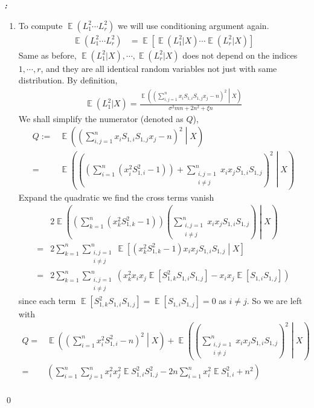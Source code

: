\documentclass[12pt]{extarticle}
\renewenvironment{proof}[1][\proofname]{ { \it\bfseries #1: }}{\qed}
\newcommand{\1}{\field{1}}
\DeclareMathOperator{\E}{\mathbb{E}}
\numberwithin{equation}{section}
\begin{document}
\begin{proof}
\begin{enumerate}[label={(\arabic*)}]
\item 
To compute $\E (L_{1}^{2} \cdots L_{r}^{2}) $ we will use conditioning argument again.
\begin{align*}
    \E (L_{1}^{2} \cdots L_{r}^{2}) 
  & = \E \left[ \E (L_{1}^{2}|X) \cdots \E (L_{r}^{2}|X) \right] 
\end{align*}
Same as before, $\E (L_{1}^{2}|X),\cdots,\E (L_{r}^{2}|X)$ does not depend on the indices $1,\cdots, r$, and they are all identical random variables not just with same distribution. By definition,
\begin{align*}
  \E \left( L_1^2| X\right)
  =  \frac{\E  \left(  (\sum_{i,j=1}^n x_i S_{1,i} S_{1,j}x_j -n)^2 \middle| X\right) }{\sigma^2 mn+2n^2 + \xi n} 
\end{align*}
We shall simplify the numerator (denoted as $Q$),
\begin{align*}
  Q:= & \E   \left( (\sum_{i,j=1}^n x_i S_{1,i} S_{1,j}x_j -n)^2 \middle| X\right) \\
  = & \E \left( \left( \left(\sum_{i=1}^n (x_i^2 S_{1,i}^2 -1) \right) +\sum_{\substack{i,j=1\\i\ne j}}^n x_ix_j S_{1,i} S_{1,j} \right)^2 \middle| X \right)
\end{align*}
Expand the quadratic we find the cross terms vanish
\begin{align*}
    & 2  \E \left( \left(\sum_{k=1}^n (x_k^2 S_{1,k}^2 -1)\right) ( \sum_{\substack{i,j=1\\i\ne j}}^n x_ix_j S_{1,i} S_{1,j}) \middle| X \right)  \\
= & 2 \sum_{k=1}^n \sum_{\substack{i,j=1\\i\ne j}}^n \E \left[(x_k^2 S_{1,k}^2 -1)x_ix_j S_{1,i} S_{1,j} \middle| X \right] \\
= & 2 \sum_{k=1}^n \sum_{\substack{i,j=1\\i\ne j}}^n (x_k^2x_ix_j\E[S_{1,k}^2 S_{1,i} S_{1,j}]- x_ix_j\E[ S_{1,i} S_{1,j}] )
\end{align*}
 since each term $ \E [S_{1,k}^2 S_{1,i} S_{1,j}]=\E[ S_{1,i} S_{1,j}]=0$ as $i\ne j$. So we are left with
\begin{align*}
  Q = & \E \left( \left( \sum_{i=1}^n x_i^2 S_{1,i}^2 -n  \right)^2 \middle| X \right)
  + \E \left( \left( \sum_{\substack{i,j=1\\i\ne j}}^n x_ix_j S_{1,i} S_{1,j} \right)^2 \middle| X \right) \\
  = & \left( \sum_{i=1}^n\sum_{j=1}^n x_i^2x_j^2 \E S_{1,i}^2 S_{1,j}^2 - 2n \sum_{i=1}^n x_i^2\E S_{1,i}^2 + n^2 \right) \\

\end{align*}
\end{enumerate}
\end{proof}
\end{document}
